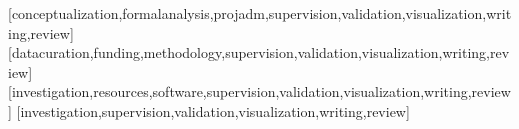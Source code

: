 \documentclass[portuguese]{textolivre}
\begin{document}
\printbibliography\label{sec-bib}


\begin{contributors}
[conceptualization,formalanalysis,projadm,supervision,validation,visualization,writing,review]
[datacuration,funding,methodology,supervision,validation,visualization,writing,review]
[investigation,resources,software,supervision,validation,visualization,writing,review]
[investigation,supervision,validation,visualization,writing,review]
\end{contributors}
\end{document}
